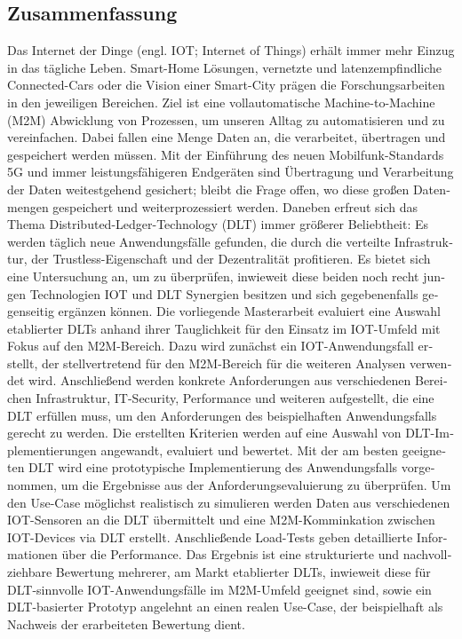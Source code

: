 \begin{otherlanguage}{ngerman}
	\chapter*{Zusammenfassung}
	Das Internet der Dinge (engl. IOT; Internet of Things) erhält immer mehr Einzug in das tägliche Leben. Smart-Home Lösungen, vernetzte und latenzempfindliche Connected-Cars oder die Vision einer Smart-City prägen die Forschungsarbeiten in den jeweiligen Bereichen. Ziel ist eine vollautomatische Machine-to-Machine (M2M) Abwicklung von Prozessen, um unseren Alltag zu automatisieren und zu vereinfachen. Dabei fallen eine Menge Daten an, die verarbeitet, übertragen und gespeichert werden müssen. Mit der Einführung des neuen Mobilfunk-Standards 5G und immer leistungsfähigeren Endgeräten sind Übertragung und Verarbeitung der Daten weitestgehend gesichert; bleibt die Frage offen, wo diese großen Datenmengen gespeichert und weiterprozessiert werden.
	Daneben erfreut sich das Thema Distributed-Ledger-Technology (DLT) immer größerer Beliebtheit: Es werden täglich neue Anwendungsfälle gefunden, die durch die verteilte Infrastruktur, der Trustless-Eigenschaft und der Dezentralität profitieren. Es bietet sich eine Untersuchung an, um zu überprüfen, inwieweit diese beiden noch recht jungen Technologien IOT und DLT Synergien besitzen und sich gegebenenfalls gegenseitig ergänzen können.
	Die vorliegende Masterarbeit evaluiert eine Auswahl etablierter DLTs anhand ihrer Tauglichkeit für den Einsatz im IOT-Umfeld mit Fokus auf den M2M-Bereich. Dazu wird zunächst ein IOT-Anwendungsfall erstellt, der stellvertretend für den M2M-Bereich für die weiteren Analysen verwendet wird. Anschließend werden konkrete Anforderungen aus verschiedenen Bereichen Infrastruktur, IT-Security, Performance und weiteren aufgestellt, die eine DLT erfüllen muss, um den Anforderungen des beispielhaften Anwendungsfalls gerecht zu werden. Die erstellten Kriterien werden auf eine Auswahl von DLT-Implementierungen angewandt, evaluiert und bewertet. Mit der am besten geeigneten DLT wird eine prototypische Implementierung des Anwendungsfalls vorgenommen, um die Ergebnisse aus der Anforderungsevaluierung zu überprüfen. Um den Use-Case möglichst realistisch zu simulieren werden Daten aus verschiedenen IOT-Sensoren an die DLT übermittelt und eine M2M-Komminkation zwischen IOT-Devices via DLT erstellt. Anschließende Load-Tests geben detaillierte Informationen über die Performance.
	Das Ergebnis ist eine strukturierte und nachvollziehbare Bewertung mehrerer, am Markt etablierter DLTs, inwieweit diese für DLT-sinnvolle IOT-Anwendungsfälle im M2M-Umfeld geeignet sind, sowie ein DLT-basierter Prototyp angelehnt an einen realen Use-Case, der beispielhaft als Nachweis der erarbeiteten Bewertung dient.
	

\end{otherlanguage}
